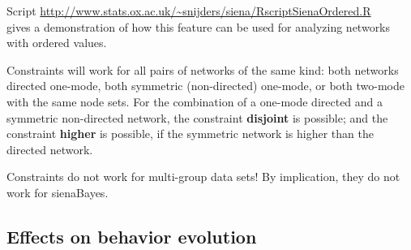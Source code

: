 \documentclass[a4paper,fleqn,11pt]{article}
\newcommand{\+}{\, + \,}
\begin{document}
Script \small{\url{http://www.stats.ox.ac.uk/~snijders/siena/RscriptSienaOrdered.R}}\\
gives a demonstration of how this feature can be used for analyzing networks
with ordered values.
\medskip

Constraints will work for all pairs of networks of the same kind:
both networks directed one-mode, both symmetric (non-directed) one-mode,
or both two-mode with the same node sets.
For the combination of a one-mode directed and a symmetric non-directed
network, the constraint \textbf{disjoint} is possible;
and the constraint \textbf{higher} is possible,
if the symmetric network is higher than the directed network.

Constraints do not work for multi-group data sets! By implication,
they do not work for \textsf{sienaBayes}.


\subsection{Effects on behavior evolution}
\label{S_eff_beh}
\end{document}

